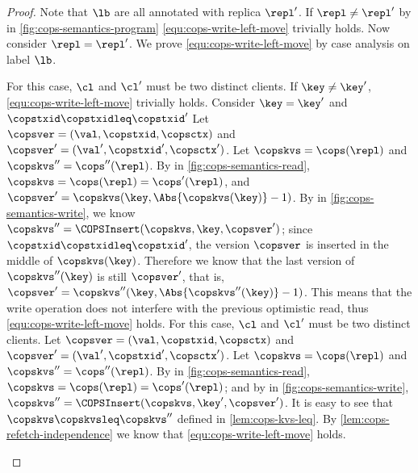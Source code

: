 \begin{proof}
Note that \( \lb \) are all annotated with replica \( \repl' \).
If \(\repl \neq \repl' \) 
by \rCOPSClient in \cref{fig:cops-semantics-program} \cref{equ:cops-write-left-move} trivially holds.
Now consider \( \repl = \repl' \).
We prove \cref{equ:cops-write-left-move} by case analysis on label \( \lb \).
\begin{enumerate}
    For this case, \( \cl \) and \( \cl' \) must be two distinct clients.
    If \( \key \neq \key' \), \cref{equ:cops-write-left-move} trivially holds.
    Consider \( \key = \key' \) and \( \copstxid \copstxidleq \copstxid' \) 
    Let \( \copsver = (\val,\copstxid, \copsctx ) \) and \( \copsver' = (\val',\copstxid', \copsctx' ) \).
    Let \( \copskvs = \cops(\repl) \) and \( \copskvs'' = \cops''(\repl) \).
    By \rCOPSOptRead in \cref{fig:cops-semantics-read}, \( \copskvs = \cops(\repl) = \cops'(\repl) \),
    and \( \copsver' = \copskvs(\key, \Abs{\copskvs(\key)} - 1 )\).
    By \rCOPSWrite in \cref{fig:cops-semantics-write}, we know \( \copskvs'' = \COPSInsert(\copskvs,\key,\copsver' ) \);
    since \( \copstxid \copstxidleq \copstxid' \), the version \( \copsver \)
    is inserted in the middle of \( \copskvs(\key) \).
    Therefore we know that the last version of \( \copskvs''(\key) \) is still \( \copsver' \),
    that is, \( \copsver' = \copskvs''(\key, \Abs{\copskvs''(\key)} - 1 ) \).
    This means that the write operation does not interfere with the previous optimistic read,
    thus \cref{equ:cops-write-left-move} holds.
    For this case, \( \cl \) and \( \cl' \) must be two distinct clients.
    Let \( \copsver = (\val,\copstxid, \copsctx ) \) and \( \copsver' = (\val',\copstxid', \copsctx' ) \).
    Let \( \copskvs = \cops(\repl) \) and \( \copskvs'' = \cops''(\repl) \).
    By \rCOPSRefetch in \cref{fig:cops-semantics-read}, \( \copskvs = \cops(\repl) = \cops'(\repl) \); 
    and by \rCOPSWrite in \cref{fig:cops-semantics-write}, \( \copskvs'' = \COPSInsert(\copskvs,\key',\copsver' ) \).
    It is easy to see that \( \copskvs \copskvsleq \copskvs'' \) defined in \cref{lem:cops-kvs-leq}.
    By \cref{lem:cops-refetch-independence} we know that \cref{equ:cops-write-left-move} holds.

\end{enumerate}
\end{proof}
